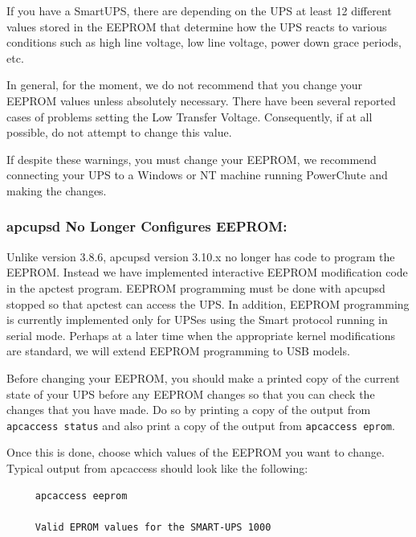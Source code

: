 {{{{{{{{\label{index-eeprom_002c-configuring-140}
\label{index-Configuring_002c-eeprom-141}
If you have a SmartUPS, there are depending on the UPS at least 12 different
values stored in the EEPROM that determine how the UPS reacts to various
conditions such as high line voltage, low line voltage, power down grace
periods, etc.  

In general, for the moment, we do not recommend that you change your EEPROM
values unless absolutely necessary. There have been several reported cases of
problems setting the Low Transfer Voltage. Consequently, if at all possible,
do not attempt to change this value.  

If despite these warnings, you must change your EEPROM, we recommend
connecting your UPS to a Windows or NT machine running PowerChute and making
the changes. 

\label{apcupsd-No-Longer-Configures-EEPROM}

\subsubsection*{apcupsd No Longer Configures EEPROM:}

Unlike version 3.8.6, apcupsd version 3.10.x no longer has code to program the
EEPROM. Instead we have implemented interactive EEPROM modification code in
the apctest program. EEPROM programming must be done with apcupsd stopped so
that apctest can access the UPS. In addition, EEPROM programming is currently
implemented only for UPSes using the Smart protocol running in serial mode.
Perhaps at a later time when the appropriate kernel modifications are
standard, we will extend EEPROM programming to USB models.  

Before changing your EEPROM, you should make a printed copy of the current
state of your UPS before any EEPROM changes so that you can check the changes
that you have made. Do so by printing a copy of the output from {\tt apcaccess
status} and also print a copy of the output from {\tt apcaccess eprom}.  

Once this is done, choose which values of the EEPROM you want to change.
Typical output from apcaccess should look like the following: 

\footnotesize
\begin{verbatim}
     apcaccess eeprom
     
     Valid EPROM values for the SMART-UPS 1000
     

\end{verbatim}}}}}}}}}
